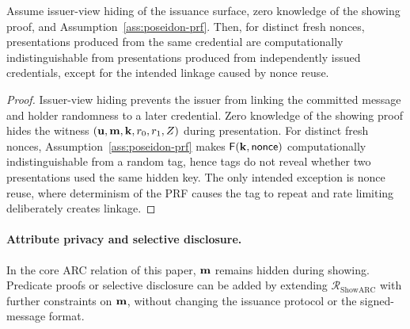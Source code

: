 \begin{proposition}\label{prop:arc-unlinkability}
Assume issuer-view hiding of the issuance surface, zero knowledge of the showing proof, and Assumption~\ref{ass:poseidon-prf}.  Then, for distinct fresh nonces, presentations produced from the same credential are
computationally indistinguishable from presentations produced from independently issued credentials, except
for the intended linkage caused by nonce reuse.
\end{proposition}

\begin{proof}
Issuer-view hiding prevents the issuer from linking the committed message and holder randomness to a later
credential.  Zero knowledge of the showing proof hides the witness
$(\mathbf{u},\mathbf{m},\mathbf{k},r_0,r_1,Z)$ during presentation.  For distinct fresh nonces, Assumption~\ref{ass:poseidon-prf}
makes $\mathsf{F}(\mathbf{k},\mathsf{nonce})$ computationally indistinguishable from a random tag, hence tags do not reveal whether two
presentations used the same hidden key.  The only intended exception is nonce reuse, where determinism of the PRF
causes the tag to repeat and rate limiting deliberately creates linkage.
\end{proof}

\paragraph{Attribute privacy and selective disclosure.}
In the core ARC relation of this paper, $\mathbf{m}$ remains hidden during showing.  Predicate proofs or selective
disclosure can be added by extending $\mathcal R_{\mathrm{ShowARC}}$ with further constraints on $\mathbf{m}$, without
changing the issuance protocol or the signed-message format.
